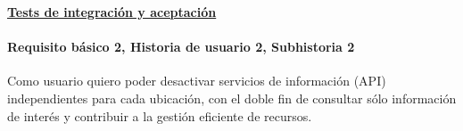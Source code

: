 \documentclass[../ei103948-project-documentation.tex]{subfiles}
\begin{document}
					\newpage

					\begin{center}
						\textbf{\underline{Tests de integración y aceptación}}
					\end{center}

					\testBasicoM

					\newpage



					\paragraph*{Requisito básico 2, Historia de usuario 2, Subhistoria 2}
					Como usuario quiero poder desactivar servicios de información (API) independientes para cada ubicación, con el doble fin de consultar sólo información de interés y contribuir a la gestión eficiente de recursos.
\end{document}
